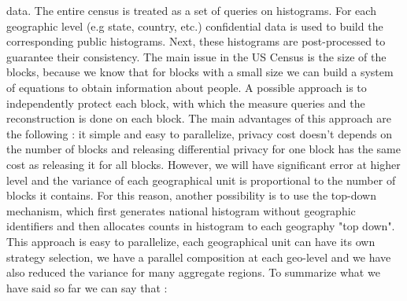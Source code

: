 data. The entire census is treated as a set of queries on histograms. For each geographic level (e.g state, country, etc.) confidential data is used to build the corresponding public histograms. Next, these histograms are post-processed to guarantee their consistency. The main issue in the US Census is the size of the blocks, because we know that for blocks with a small size we can build a system of equations to obtain information about people. A possible approach is to independently protect each block, with which the measure queries and the reconstruction is done on each block. The main advantages of this approach are the following : it simple and easy to parallelize, privacy cost doesn't depends on the number of blocks and releasing differential privacy for one block has the same cost as releasing it for all blocks. However, we will have significant error at higher level and the variance of each geographical unit is proportional to the number of blocks it contains. For this reason, another possibility is to use the top-down mechanism, which first generates national histogram without geographic identifiers and then allocates counts in histogram to each geography "top down". This approach is easy to parallelize, each geographical unit can have its own strategy selection, we have a parallel composition at each geo-level and we have also reduced the variance for many aggregate regions. To summarize what we have said so far we can say that :
